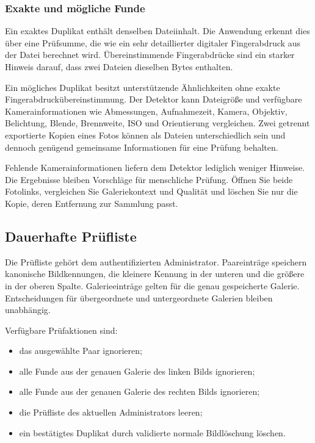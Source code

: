 \documentclass[11pt,a4paper]{article}
\begin{document}
\subsubsection{Exakte und mögliche Funde}

Ein exaktes Duplikat enthält denselben Dateiinhalt. Die Anwendung erkennt dies
über eine Prüfsumme, die wie ein sehr detaillierter digitaler Fingerabdruck aus
der Datei berechnet wird. Übereinstimmende Fingerabdrücke sind ein starker
Hinweis darauf, dass zwei Dateien dieselben Bytes enthalten.

Ein mögliches Duplikat besitzt unterstützende Ähnlichkeiten ohne exakte
Fingerabdruckübereinstimmung. Der Detektor kann Dateigröße und verfügbare
Kamerainformationen wie Abmessungen, Aufnahmezeit, Kamera, Objektiv, Belichtung,
Blende, Brennweite, ISO und Orientierung vergleichen. Zwei getrennt exportierte
Kopien eines Fotos können als Dateien unterschiedlich sein und dennoch genügend
gemeinsame Informationen für eine Prüfung behalten.

Fehlende Kamerainformationen liefern dem Detektor lediglich weniger Hinweise.
Die Ergebnisse bleiben Vorschläge für menschliche Prüfung. Öffnen Sie beide
Fotolinks, vergleichen Sie Galeriekontext und Qualität und löschen Sie nur die
Kopie, deren Entfernung zur Sammlung passt.

\subsection{Dauerhafte Prüfliste}

Die Prüfliste gehört dem authentifizierten Administrator. Paareinträge speichern
kanonische Bildkennungen, die kleinere Kennung in der unteren und die größere in
der oberen Spalte. Galerieeinträge gelten für die genau gespeicherte Galerie.
Entscheidungen für übergeordnete und untergeordnete Galerien bleiben unabhängig.

Verfügbare Prüfaktionen sind:

\begin{itemize}
  \item das ausgewählte Paar ignorieren;
  \item alle Funde aus der genauen Galerie des linken Bilds ignorieren;
  \item alle Funde aus der genauen Galerie des rechten Bilds ignorieren;
  \item die Prüfliste des aktuellen Administrators leeren;
  \item ein bestätigtes Duplikat durch validierte normale Bildlöschung löschen.
\end{itemize}
\end{document}
